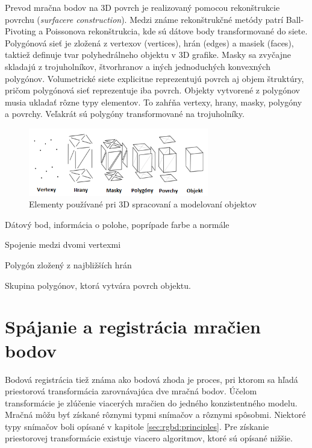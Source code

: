 Prevod mračna bodov na 3D povrch je realizovaný pomocou rekonštrukcie povrchu (\textit{surfacere construction}). Medzi známe rekonštrukčné metódy patrí Ball-Pivoting a  Poissonova rekonštrukcia, kde sú dátove body transformované do siete. Polygónová sieť je zložená z vertexov (vertices), hrán (edges) a masiek (faces), taktiež definuje tvar polyhedrálneho objektu v 3D grafike. Masky sa zvyčajne skladajú z trojuholníkov, štvorhranov a iných jednoduchých konvexných polygónov. Volumetrické siete explicitne reprezentujú povrch aj objem štruktúry, pričom polygónová sieť reprezentuje iba povrch. Objekty vytvorené z polygónov musia ukladať rôzne typy elementov. To zahŕňa vertexy, hrany, masky, polygóny a povrchy. Veľakrát sú polygóny transformované na trojuholníky.

\begin{figure}[h]

	\centering
	\includegraphics[width=0.7\textwidth]{figures/vertex_edge_polygon.png} 
	\caption{Elementy používané pri 3D spracovaní a modelovaní objektov }
	\label{fig:vertex_edge_polygon}

\end{figure}

\begin{description}[leftmargin=*,labelsep=5.8mm, font=$\bullet$~\normalfont\scshape\color{black!20!black}]
	\item[Vertex] Dátový bod, informácia o polohe, poprípade farbe a normále 
	\item[Hrana] Spojenie medzi dvomi vertexmi 
	\item[Maska] Polygón zložený z najbližších hrán
	\item[Povrch] Skupina polygónov, ktorá vytvára povrch objektu.
\end{description}

\newpage
\section{Spájanie a registrácia mračien bodov}

Bodová registrácia tiež známa ako bodová zhoda je proces, pri ktorom sa hľadá priestorová transformácia zarovnávajúca dve mračná bodov. Účelom transformácie je zlúčenie viacerých mračien do jedného konzistentného modelu. Mračná môžu byť získané rôznymi typmi snímačov a rôznymi spôsobmi. Niektoré typy snímačov boli opísané v kapitole \ref{sec:rgbd:principles}. Pre získanie priestorovej transformácie existuje viacero algoritmov, ktoré sú opísané nižšie.


